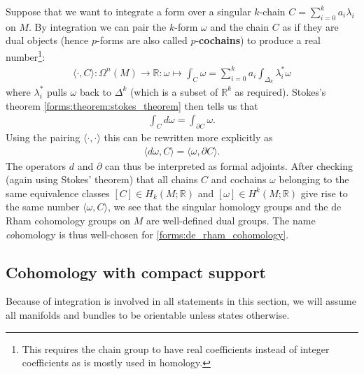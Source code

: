     Suppose that we want to integrate a form over a singular $k$-chain $C = \sum_{i=0}^ka_i\lambda_i$ on $M$. By integration we can pair the $k$-form $\omega$ and the chain $C$ as if they are dual objects (hence $p$-forms are also called $p$-\textbf{cochains}) to produce a real number\footnote{This requires the chain group to have real coefficients instead of integer coefficients as is mostly used in homology.}:
    \begin{gather}
        \langle\cdot,C\rangle:\Omega^n(M)\rightarrow\mathbb{R}:\omega\mapsto\int_C\omega = \sum_{i=0}^ka_i\int_{\Delta_k}\lambda_i^{*}\omega
    \end{gather}
    where $\lambda_i^*$ pulls $\omega$ back to $\Delta^k$ (which is a subset of $\mathbb{R}^k$ as required). Stokes's theorem \ref{forms:theorem:stokes_theorem} then tells us that
    \begin{gather}
        \int_Cd\omega = \int_{\partial C}\omega.
    \end{gather}
    Using the pairing $\langle\cdot,\cdot\rangle$ this can be rewritten more explicitly as
    \begin{gather}
        \langle d\omega, C\rangle = \langle \omega, \partial C\rangle.
    \end{gather}
    The operators $d$ and $\partial$ can thus be interpreted as formal adjoints. After checking (again using Stokes' theorem) that all chains $C$ and cochains $\omega$ belonging to the same equivalence classes $[C]\in H_k(M; \mathbb{R})$ and $[\omega]\in H^k(M; \mathbb{R})$ give rise to the same number $\langle\omega, C\rangle$, we see that the singular homology groups and the de Rham cohomology groups on $M$ are well-defined dual groups. The name \textit{co}homology is thus well-chosen for \ref{forms:de_rham_cohomology}.

\subsection{Cohomology with compact support}

    Because of integration is involved in all statements in this section, we will assume all manifolds and bundles to be orientable unless states otherwise.

